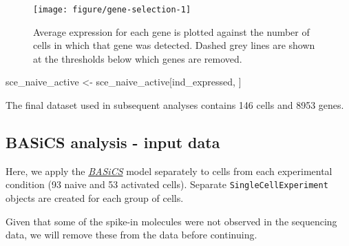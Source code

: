 \documentclass[9pt,a4paper,]{extarticle}
\newenvironment{Shaded}{\begin{snugshade}}{\end{snugshade}}
\newcommand{\NormalTok}[1]{#1}
\newcommand{\OperatorTok}[1]{\textcolor[rgb]{0.81,0.36,0.00}{\textbf{#1}}}
\newcommand{\StringTok}[1]{\textcolor[rgb]{0.31,0.60,0.02}{#1}}
\begin{document}
\begin{figure}

{\centering \texttt{[image: figure/gene-selection-1]} 

}

\caption{Average expression for each gene is plotted against the number of cells in which that gene was detected. Dashed grey lines are shown at the thresholds below which genes are removed.}\label{fig:gene-selection}
\end{figure}

\begin{Shaded}
\begin{Highlighting}[]
\NormalTok{sce_naive_active <-}\StringTok{ }\NormalTok{sce_naive_active[ind_expressed, ]}
\end{Highlighting}
\end{Shaded}

The final dataset used in subsequent analyses contains 146
cells and 8953 genes.

\hypertarget{basics-analysis---input-data}{%
\subsection{BASiCS analysis - input data}\label{basics-analysis---input-data}}

Here, we apply the \emph{\href{https://bioconductor.org/packages/3.11/BASiCS}{BASiCS}} model separately to cells from each
experimental condition (93
naive and 53 activated cells).
Separate \texttt{SingleCellExperiment} objects are created for each group of cells.

\begin{Shaded}
\end{Shaded}

Given that some of the spike-in molecules were not observed in the sequencing
data, we will remove these from the data before continuing.
\end{document}
